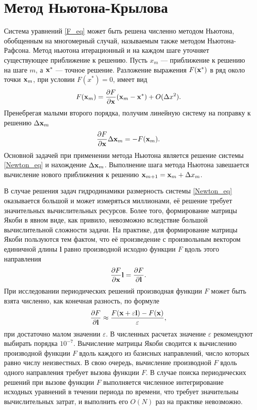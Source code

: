 \section{Метод Ньютона-Крылова}

Система уравнений \eqref{F_eq} может быть решена численно методом Ньютона, обобщенным на многомерный случай, называемым также методом Ньютона-Рафсона. Метод ньютона итерационный и на каждом шаге уточняет существующее приближение к решению. Пусть $x_m$ --- приближение к решению на шаге $m$, а $\mathbf{x}^*$ --- точное решение. Разложение выражения $F(\mathbf{x}^*)$ в ряд около точки $\mathbf{x}_m$, при условии $F(x^*) = 0$, имеет вид
\begin{equation}
F(\mathbf{x}_m) = \frac{\partial F}{\partial \mathbf{x}} (\mathbf{x}_m - \mathbf{x}^*) + O(\Delta x^2). 
\end{equation}
Пренебрегая малыми второго порядка, получим линейную систему на поправку к решению $\Delta \mathbf{x}_m$
\begin{equation}\label{Newton_eq}
\frac{\partial F}{\partial \mathbf{x}} \Delta \mathbf{x}_m = - F(\mathbf{x}_m). 
\end{equation}
Основной задачей при применении метода Ньютона является решение системы \eqref{Newton_eq} и нахождение $\Delta \mathbf{x}_m$. Выполнение шага метода Ньютона завешается вычисление нового приближения к решению $\mathbf{x}_{m+1} = \mathbf{x}_m + \Delta x_m$. 


\def\l{\mathbf{l}}
В случае решения задач гидродинамики размерность системы \eqref{Newton_eq} оказывается большой и может измеряться миллионами, её решение требует значительных вычислительных ресурсов. Более того, формирование матрицы Якоби в явном виде, как привило, невозможно вследствие большой вычислительной сложности задачи. На практике, для формирование матрицы Якоби пользуются тем фактом, что её произведение с произвольным вектором единичной длины $\l$ равно производной исходно функции $F$ вдоль этого направления
\begin{equation}
\pd{F}{\x} \l = \pd{F}{\l}. 
\end{equation}
При исследовании периодических решений производная функции $F$ может быть взята численно, как конечная разность, по формуле
\begin{equation}\label{fd_eq}
\pd{F}{\l} \approx \frac{F(\x + \varepsilon \l) - F(\x)}{\varepsilon},
\end{equation}
при достаточно малом значении $\varepsilon$. В численных расчетах значение $\varepsilon$ рекомендуют выбирать порядка $10^{-7}$. Вычисление матрицы Якоби сводится к вычислению производной функции $F$ вдоль каждого из базисных направлений, число которых равно числу неизвестных. В свою очередь, вычисление производной $F$ вдоль одного направления требует вызова функции $F$. В случае поиска периодических решений при вызове функции $F$ выполняется численное интегрирование исходных уравнений в течении периода по времени, что требует значительны вычислительных затрат, и выполнить его $O(N)$ раз на практике невозможно. 

